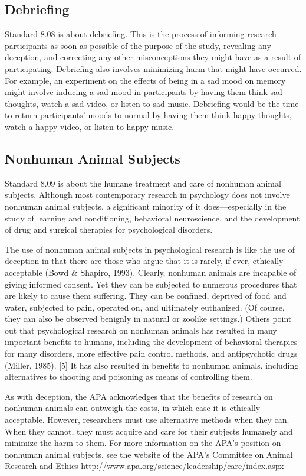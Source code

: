 \subsection{Debriefing}


Standard 8.08 is about debriefing. This is the process of informing research participants as soon as possible of the purpose of the study, revealing any deception, and correcting any other misconceptions they might have as a result of participating. Debriefing also involves minimizing harm that might have occurred. For example, an experiment on the effects of being in a sad mood on memory might involve inducing a sad mood in participants by having them think sad thoughts, watch a sad video, or listen to sad music. Debriefing would be the time to return participants' moods to normal by having them think happy thoughts, watch a happy video, or listen to happy music.


\subsection{Nonhuman Animal Subjects}


Standard 8.09 is about the humane treatment and care of nonhuman animal subjects. Although most
contemporary research in psychology does not involve nonhuman animal subjects, a significant minority of it does---especially in the study of learning and conditioning, behavioral neuroscience, and the development of drug and surgical therapies for psychological disorders.


The use of nonhuman animal subjects in psychological research is like the use of deception in that there are those who argue that it is rarely, if ever, ethically acceptable (Bowd \& Shapiro, 1993). Clearly, nonhuman animals are incapable of giving informed consent. Yet they can be subjected to numerous procedures that are likely to cause them suffering. They can be confined, deprived of food and water, subjected to pain, operated on, and ultimately euthanized. (Of course, they can also be observed benignly in natural or zoolike settings.) Others point out that psychological research on nonhuman animals has resulted in many important benefits to humans, including the development of behavioral therapies for many disorders, more effective pain control methods, and antipsychotic drugs (Miller, 1985). [5] It has also resulted in benefits to nonhuman animals, including alternatives to shooting and poisoning as means of controlling them.


As with deception, the APA acknowledges that the benefits of research on nonhuman animals can outweigh the costs, in which case it is ethically acceptable. However, researchers must use alternative methods when they can. When they cannot, they must acquire and care for their subjects humanely and minimize the harm to them. For more information on the APA's position on nonhuman animal subjects, see the website of the APA's Committee on Animal Research and Ethics \url{http://www.apa.org/science/leadership/care/index.aspx}


